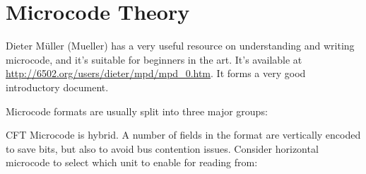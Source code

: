 


\section{Microcode Theory}

Dieter Müller (Mueller) has a very useful resource on understanding
and writing microcode, and it's suitable for beginners in the
art. It's available at
\url{http://6502.org/users/dieter/mpd/mpd_0.htm}. It forms a very good
introductory document.

Microcode formats are usually split into three major groups:


CFT Microcode is hybrid. A number of fields in the format are
vertically encoded to save bits, but also to avoid bus contention
issues. Consider horizontal microcode to select which unit to enable
for reading from:


